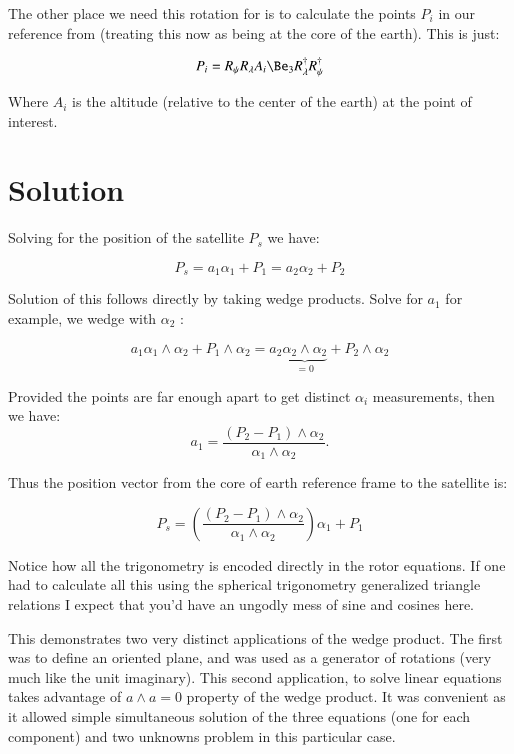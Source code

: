 The other place we need this rotation for is to calculate the points $P_i$ in our reference from (treating this now as being at the core of the earth).  This is just:

\begin{equation}
P_i = R_{\psi} R_{\lambda} A_i \Be_3 R_{\lambda}^\dagger R_{\psi}^\dagger
\end{equation}

Where $A_i$ is the altitude (relative to the center of the earth) at the point of interest.

\section{Solution }

Solving for the position of the satellite $P_s$ we have:

\[
P_s = a_1 \alpha_1 + P_1 = a_2 \alpha_2 + P_2
\]

Solution of this follows directly by taking wedge products.  Solve for $a_1$ for example, we wedge with $\alpha_2$ :

\[
a_1 \alpha_1 \wedge \alpha_2 + P_1 \wedge \alpha_2 = a_2 \underbrace{\alpha_2 \wedge \alpha_2}_{=0} + P_2 \wedge \alpha_2
\]

Provided the points are far enough apart to get distinct $\alpha_i$ measurements, then we have:
\[
a_1 = \frac{(P_2-P_1) \wedge \alpha_2}{ \alpha_1 \wedge \alpha_2 }.
\]

Thus the position vector from the core of earth reference frame to the satellite is:

\begin{equation}
P_s = \left(\frac{(P_2-P_1) \wedge \alpha_2}{ \alpha_1 \wedge \alpha_2 }\right) \alpha_1 + P_1
\end{equation}

Notice how all the trigonometry is encoded directly in the rotor equations.  If one had to calculate all this using the spherical trigonometry generalized triangle relations I expect that you'd have an ungodly mess of sine and cosines here.

This demonstrates two very distinct applications of the wedge product.  The first was to define an oriented plane, and was used as a generator of rotations (very much like the unit imaginary).  This second application, to solve linear equations takes advantage of $a \wedge a = 0$ property of the wedge product.  It was convenient as it allowed simple simultaneous solution of the three equations (one for each component) and two unknowns problem in this particular case. 


